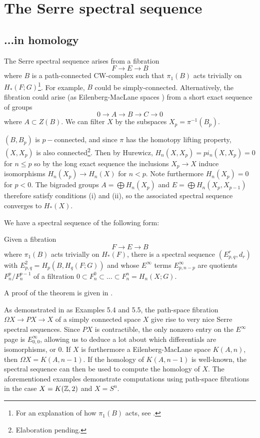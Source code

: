 \section{The Serre spectral sequence}
\subsection{...in homology}
The Serre spectral sequence arises from a fibration
$$F\rightarrow E \rightarrow B$$
where $B$ is a path-connected CW-complex such that $\pi_1(B)$ acts trivially on $H_*(F;G)$\footnote{For an explanation of how $\pi_1(B)$ acts, see \cite{Hatcher-spec}.}.  For example, $B$ could be simply-connected. Alternatively, the fibration could arise (as Eilenberg-MacLane spaces \cite{Hatcher-spec}) from a short exact sequence of groups $$0\rightarrow A\rightarrow B\rightarrow C\rightarrow 0$$ where $A\subset Z(B)$. We can filter $X$ by the subspaces $X_p=\pi^{-1}(B_p)$. 

$(B,B_p)$ is $p-$connected, and since $\pi$ has the homotopy lifting property, $(X,X_p)$ is also connected\footnote{Elaboration pending.}. Then by Hurewicz, $H_n(X,X_p)=pi_n(X,X_p)=0$ for $n\leq p$ so by the long exact sequence the inclusions $X_p\rightarrow X$ induce isomorphisms $H_n(X_p)\rightarrow H_n(X)$ for $n<p.$ Note furthermore $H_n(X_p)=0$ for $p<0$. The bigraded groups $A=\bigoplus H_n(X_p)$ and $E=\bigoplus H_n(X_p,X_{p-1})$ therefore satisfy conditions (i) and (ii), so the associated spectral sequence converges to $H_*(X).$ 

We have a spectral sequence of the following form:
\begin{theorem}\label{thm:serre-spec}
Given a fibration $$F\rightarrow E \rightarrow B$$ where $\pi_1(B)$ acts trivially on $H_*(F)$, there is a spectral sequence $(E_{p,q}^r,d_r)$ with $E_{p,q}^2=H_p(B,H_q(F;G))$ and whose $E^{\infty}$ terms $E^\infty_{p,n-p}$ are quotients $F_n^p/F_n^{p-1}$ of a filtration $0\subset F_n^0\subset\dots\subset F_n^n=H_n(X;G)$.
\end{theorem} A proof of the theorem is given in \cite{Hatcher-spec}.

As demonstrated in \cite{Hatcher-spec} as Examples 5.4 and 5.5, the path-space fibration $\Omega X\rightarrow PX\rightarrow X$ of a simply connected space $X$ give rise to very nice Serre spectral sequences. Since $PX$ is contractible, the only nonzero entry on the $E^\infty$ page is $E^{\infty}_{0,0}$, allowing us to deduce a lot about which differentials are isomorphisms, or $0$. If $X$ is furthermore a Eilenberg-MacLane space $K(A,n)$, then $\Omega X=K(A,n-1)$. If the homology of $K(A,n-1)$ is well-known, the spectral sequence can then be used to compute the homology of $X$. The aforementioned examples demonstrate computations using path-space fibrations in the case $X=K(\mathbb{Z},2)$ and $X=S^n$.

